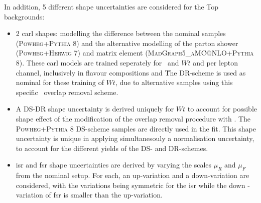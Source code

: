In addition, 5 different shape uncertainties are considered for the Top backgrounds: 
\begin{itemize}
    \item 2 \gls{carl} shapes: modelling the difference between the nominal samples (\textsc{Powheg}+\textsc{Pythia} 8) and the alternative modelling of the parton shower (\textsc{Powheg}+\textsc{Herwig} 7) and matrix element (\textsc{MadGraph5\_aMC@NLO}+\textsc{Pythia} 8). These \gls{carl} models are trained seperately for \ttb\ and $Wt$ and per lepton channel, inclusively in flavour compositions and \nj\. The DR-scheme is used as nominal for these training of $Wt$, due to alternative samples using this specific \ttb\ overlap removal scheme. 
    \item A DS-DR shape uncertainty is derived uniquely for $Wt$ to account for possible shape effect of the modification of the overlap removal procedure with \ttb. The \textsc{Powheg}+\textsc{Pythia} 8 DS-scheme samples are directly used in the fit. This shape uncertainty is unique in applying simultanesouly a normalisation uncertainty, to account for the different yields of the DS- and DR-schemes.
    \item \gls{isr} and \gls{fsr} shape uncertainties are derived by varying the scales $\mu_R$ and $\mu_F$ from the nominal setup. For each, an up-variation and a down-variation are considered, with the variations being symmetric for the \gls{isr} while the down -variation of \gls{fsr} is smaller than the up-variation. %
\end{itemize} 


